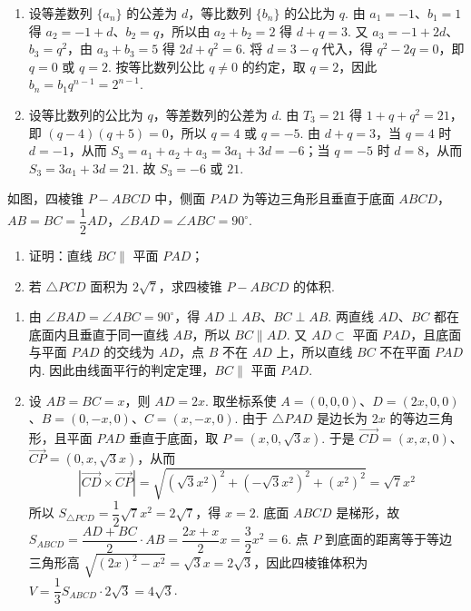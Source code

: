 \begin{solution}
\begin{enumerate}
\item 设等差数列 \(\{a_n\}\) 的公差为 \(d\)，等比数列 \(\{b_n\}\) 的公比为 \(q\). 由 \(a_1=-1\)、\(b_1=1\) 得 \(a_2=-1+d\)、\(b_2=q\)，所以由 \(a_2+b_2=2\) 得 \(d+q=3\). 又 \(a_3=-1+2d\)、\(b_3=q^2\)，由 \(a_3+b_3=5\) 得 \(2d+q^2=6\). 将 \(d=3-q\) 代入，得 \(q^2-2q=0\)，即 \(q=0\) 或 \(q=2\). 按等比数列公比 \(q\ne0\) 的约定，取 \(q=2\)，因此 \(b_n=b_1q^{n-1}=2^{n-1}\).
\item 设等比数列的公比为 \(q\)，等差数列的公差为 \(d\). 由 \(T_3=21\) 得 \(1+q+q^2=21\)，即 \((q-4)(q+5)=0\)，所以 \(q=4\) 或 \(q=-5\). 由 \(d+q=3\)，当 \(q=4\) 时 \(d=-1\)，从而 \(S_3=a_1+a_2+a_3=3a_1+3d=-6\)；当 \(q=-5\) 时 \(d=8\)，从而 \(S_3=3a_1+3d=21\). 故 \(S_3=-6\) 或 \(21\).
\end{enumerate}
\end{solution}

\begin{problem}
如图，四棱锥 \(P-ABCD\) 中，侧面 \(PAD\) 为等边三角形且垂直于底面 \(ABCD\)，\(AB=BC=\dfrac12AD\)，\(\angle BAD=\angle ABC=90^\circ\).
\begin{enumerate}
\item 证明：直线 \(BC\parallel\) 平面 \(PAD\)；
\item 若 \(\triangle PCD\) 面积为 \(2\sqrt7\)，求四棱锥 \(P-ABCD\) 的体积.
\end{enumerate}

\end{problem}

\begin{solution}
\begin{enumerate}
\item 由 \(\angle BAD=\angle ABC=90^\circ\)，得 \(AD\perp AB\)、\(BC\perp AB\). 两直线 \(AD\)、\(BC\) 都在底面内且垂直于同一直线 \(AB\)，所以 \(BC\parallel AD\). 又 \(AD\subset\) 平面 \(PAD\)，且底面与平面 \(PAD\) 的交线为 \(AD\)，点 \(B\) 不在 \(AD\) 上，所以直线 \(BC\) 不在平面 \(PAD\) 内. 因此由线面平行的判定定理，\(BC\parallel\) 平面 \(PAD\).
\item 设 \(AB=BC=x\)，则 \(AD=2x\). 取坐标系使 \(A=(0,0,0)\)、\(D=(2x,0,0)\)、\(B=(0,-x,0)\)、\(C=(x,-x,0)\). 由于 \(\triangle PAD\) 是边长为 \(2x\) 的等边三角形，且平面 \(PAD\) 垂直于底面，取 \(P=(x,0,\sqrt3x)\). 于是 \(\overrightarrow{CD}=(x,x,0)\)、\(\overrightarrow{CP}=(0,x,\sqrt3x)\)，从而
\[
\left|\overrightarrow{CD}\times\overrightarrow{CP}\right|=\sqrt{(\sqrt3x^2)^2+(-\sqrt3x^2)^2+(x^2)^2}=\sqrt7x^2
\]
所以 \(S_{\triangle PCD}=\dfrac12\sqrt7x^2=2\sqrt7\)，得 \(x=2\). 底面 \(ABCD\) 是梯形，故 \(S_{ABCD}=\dfrac{AD+BC}{2}\cdot AB=\dfrac{2x+x}{2}x=\dfrac32x^2=6\). 点 \(P\) 到底面的距离等于等边三角形高 \(\sqrt{(2x)^2-x^2}=\sqrt3x=2\sqrt3\)，因此四棱锥体积为 \(V=\dfrac13S_{ABCD}\cdot2\sqrt3=4\sqrt3\).
\end{enumerate}
\end{solution}

